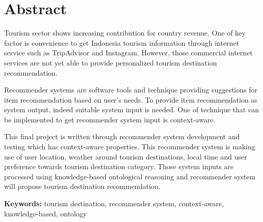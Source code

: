 \chapter*{Abstract}

\par
Tourism sector shows increasing contribution for country revenue. One of key factor is convenience to get Indonesia tourism information through internet service such as TripAdvisor
and Instagram. However, those commercial internet services are not yet able to provide personalized tourism destination
recommendation.
\par
Recommender systems are software tools and technique providing suggestions for item recommendation
based on user's needs. To provide item recommendation as system output, indeed suitable system input is needed. One of technique that can be implemented
to get recommender system input is context-aware.
\par
This final project is written through recommender system development and testing which has context-aware properties. This recommender
system is making use of user location, weather around tourism destinations, local time and user preference towards 
tourism destination category. Those system inputs are processed using knowledge-based ontological reasoning and recommender system
will propose tourism destination recommendation.

\vspace{0.5 cm}
\begin{flushleft}
{\textbf{Keywords:} tourism destination, recommender system, context-aware, knowledge-based, ontology}
\end{flushleft}